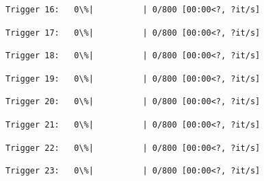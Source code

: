 \documentclass[11pt]{article}
\begin{document}
    
    
    \begin{Verbatim}[commandchars=\\\{\}]
Trigger 16:   0\%|          | 0/800 [00:00<?, ?it/s]
    \end{Verbatim}

    
    
    \begin{Verbatim}[commandchars=\\\{\}]
Trigger 17:   0\%|          | 0/800 [00:00<?, ?it/s]
    \end{Verbatim}

    
    
    \begin{Verbatim}[commandchars=\\\{\}]
Trigger 18:   0\%|          | 0/800 [00:00<?, ?it/s]
    \end{Verbatim}

    
    
    \begin{Verbatim}[commandchars=\\\{\}]
Trigger 19:   0\%|          | 0/800 [00:00<?, ?it/s]
    \end{Verbatim}

    
    
    \begin{Verbatim}[commandchars=\\\{\}]
Trigger 20:   0\%|          | 0/800 [00:00<?, ?it/s]
    \end{Verbatim}

    
    
    \begin{Verbatim}[commandchars=\\\{\}]
Trigger 21:   0\%|          | 0/800 [00:00<?, ?it/s]
    \end{Verbatim}

    
    
    \begin{Verbatim}[commandchars=\\\{\}]
Trigger 22:   0\%|          | 0/800 [00:00<?, ?it/s]
    \end{Verbatim}

    
    
    \begin{Verbatim}[commandchars=\\\{\}]
Trigger 23:   0\%|          | 0/800 [00:00<?, ?it/s]
    \end{Verbatim}
\end{document}
